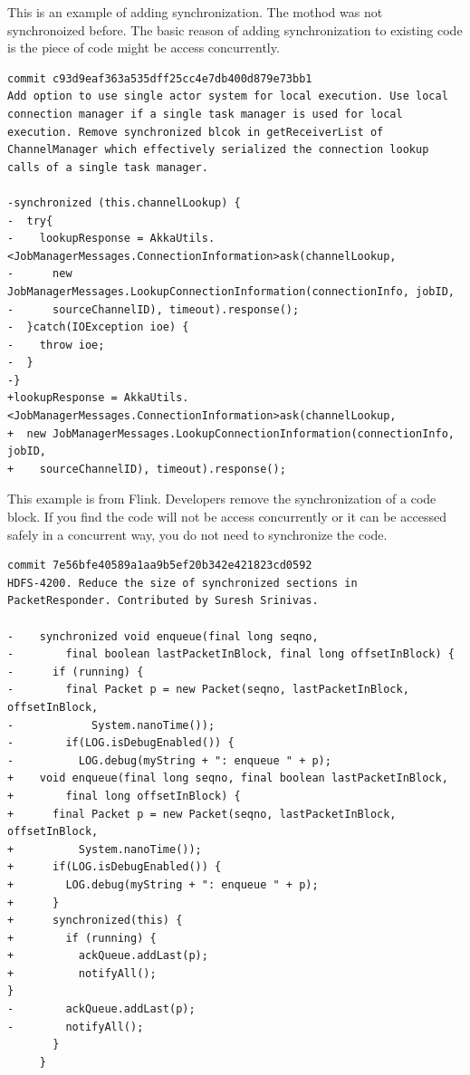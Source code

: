 \documentclass[conference]{IEEEtran}
\begin{document}
This is an example of adding synchronization. The mothod was not synchronoized before. The basic reason of adding synchronization to existing code is the piece of code might be access concurrently.

\begin{lstlisting}
commit c93d9eaf363a535dff25cc4e7db400d879e73bb1
Add option to use single actor system for local execution. Use local connection manager if a single task manager is used for local execution. Remove synchronized blcok in getReceiverList of ChannelManager which effectively serialized the connection lookup calls of a single task manager.

-synchronized (this.channelLookup) {
-  try{
-    lookupResponse = AkkaUtils.<JobManagerMessages.ConnectionInformation>ask(channelLookup,
-      new JobManagerMessages.LookupConnectionInformation(connectionInfo, jobID,
-      sourceChannelID), timeout).response();
-  }catch(IOException ioe) {
-    throw ioe;
-  }
-}
+lookupResponse = AkkaUtils.<JobManagerMessages.ConnectionInformation>ask(channelLookup,
+  new JobManagerMessages.LookupConnectionInformation(connectionInfo, jobID,
+    sourceChannelID), timeout).response();
\end{lstlisting}

This example is from Flink. Developers remove the synchronization of a code block. If you find the code will not be access concurrently or it can be accessed safely in a concurrent way, you do not need to synchronize the code.

\begin{lstlisting}
commit 7e56bfe40589a1aa9b5ef20b342e421823cd0592
HDFS-4200. Reduce the size of synchronized sections in PacketResponder. Contributed by Suresh Srinivas.

-    synchronized void enqueue(final long seqno,
-        final boolean lastPacketInBlock, final long offsetInBlock) {
-      if (running) {
-        final Packet p = new Packet(seqno, lastPacketInBlock, offsetInBlock,
-            System.nanoTime());
-        if(LOG.isDebugEnabled()) {
-          LOG.debug(myString + ": enqueue " + p);
+    void enqueue(final long seqno, final boolean lastPacketInBlock,
+        final long offsetInBlock) {
+      final Packet p = new Packet(seqno, lastPacketInBlock, offsetInBlock,
+          System.nanoTime());
+      if(LOG.isDebugEnabled()) {
+        LOG.debug(myString + ": enqueue " + p);
+      }
+      synchronized(this) {
+        if (running) {
+          ackQueue.addLast(p);
+          notifyAll();
}
-        ackQueue.addLast(p);
-        notifyAll();
       }
     }
\end{lstlisting}
\end{document}
